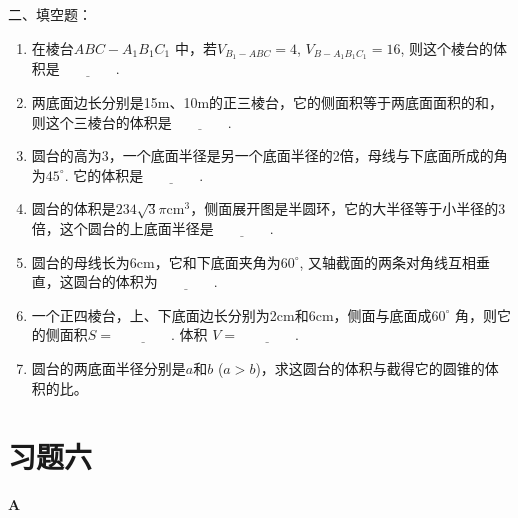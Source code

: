 二、填空题：
\begin{enumerate}
    \item 在棱台$ABC-A_{1}B_{1}C_{1}$ 中，若$V_{B_1-ABC}=4$,  $V_{B-A_{1}B_{1}C_{1}}=16$, 则这个棱台的体积是$\underline{\qquad\qquad}$.

    \item 两底面边长分别是15m、10m的正三棱台，它的侧面积等于两底面面积的和，则这个三棱台的体积是$\underline{\qquad\qquad}$.

    \item 圆台的高为3，一个底面半径是另一个底面半径的2倍，母线与下底面所成的角为$45^{\circ}$. 它的体积是$\underline{\qquad\qquad}$.

\item 圆台的体积是$234\sqrt{3}\pi\mathrm{cm}^{3}$，侧面展开图是半圆环，它的大半径等于小半径的3倍，这个圆台的上底面半径是$\underline{\qquad\qquad}$.

\item 圆台的母线长为6cm，它和下底面夹角为$60^{\circ}$, 又轴截面的两条对角线互相垂直，这圆台的体积为$\underline{\qquad\qquad}$.

\item 一个正四棱台，上、下底面边长分别为2cm和6cm，侧面与底面成$60^{\circ}$ 角，则它的侧面积$S=\underline{\qquad\qquad}$. 体积 $V=\underline{\qquad\qquad}$.

\item 圆台的两底面半径分别是$a$和$b$ ($a>b$)，求这圆台的体积与截得它的圆锥的体积的比。
\end{enumerate}


\section*{习题六}

\begin{center}
    \bfseries A
\end{center}

